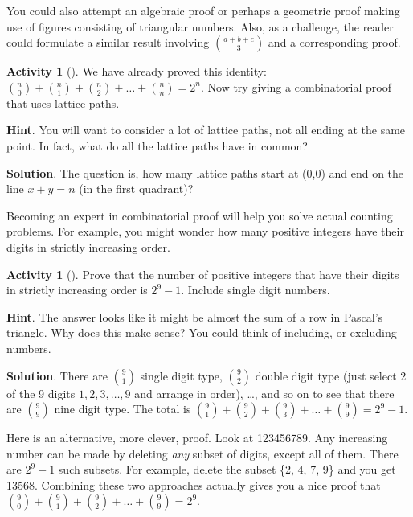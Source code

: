 \documentclass[10pt,]{book}
\theoremstyle{plain}
\theoremstyle{definition}
\theoremstyle{definition}
\theoremstyle{definition}
\newtheorem{activity}[project]{Activity}
\theoremstyle{definition}
\numberwithin{equation}{chapter}
\begin{document}
\hypertarget{p-590}{}%
You could also attempt an algebraic proof or perhaps a geometric proof making use of figures consisting of triangular numbers. Also, as a challenge, the reader could formulate a similar result involving \(\binom{a + b + c}{3}\) and a corresponding proof.%
\begin{activity}[]\label{activity-39}
\hypertarget{p-591}{}%
We have already proved this identity: \(\binom{n}{0} + \binom{n}{1} + \binom{n}{2} + \ldots + \binom{n}{n} = 2^{n}\).  Now try giving a combinatorial proof that uses lattice paths.%
\par\smallskip%
\noindent\textbf{Hint}.\hypertarget{hint-27}{}\quad%
\hypertarget{p-592}{}%
You will want to consider a lot of lattice paths, not all ending at the same point.  In fact, what do all the lattice paths have in common?%
\par\smallskip%
\noindent\textbf{Solution}.\hypertarget{solution-47}{}\quad%
\hypertarget{p-593}{}%
The question is, how many lattice paths start at (0,0) and end on the line \(x+y=n\) (in the first quadrant)?%
\end{activity}
\hypertarget{p-594}{}%
Becoming an expert in combinatorial proof will help you solve actual counting problems.  For example, you might wonder how many positive integers have their digits in strictly increasing order.%
\begin{activity}[]\label{activity-40}
\hypertarget{p-595}{}%
Prove that the number of positive integers that have their digits in strictly increasing order is \(2^{9} - 1\). Include single digit numbers.%
\par\smallskip%
\noindent\textbf{Hint}.\hypertarget{hint-28}{}\quad%
\hypertarget{p-596}{}%
The answer looks like it might be almost the sum of a row in Pascal's triangle.  Why does this make sense?  You could think of including, or excluding numbers.%
\par\smallskip%
\noindent\textbf{Solution}.\hypertarget{solution-48}{}\quad%
\hypertarget{p-597}{}%
There are \(\binom{9}{1}\) single digit type, \(\binom{9}{2}\) double digit type (just select 2 of the 9 digits \(1, 2, 3, \ldots, 9\) and arrange in order), \ldots, and so on to see that there are \(\binom{9}{9}\) nine digit type. The total is \(\binom{9}{1} + \binom{9}{2} + \binom{9}{3} + \ldots + \binom{9}{9} = 2^{9} - 1\).%
\par
\hypertarget{p-598}{}%
Here is an alternative, more clever, proof. Look at 123456789. Any increasing number can be made by deleting \emph{any} subset of digits, except all of them. There are \(2^{9} - 1\) such subsets. For example, delete the subset \{2, 4, 7, 9\} and you get 13568. Combining these two approaches actually gives you a nice proof that \(\binom{9}{0} + \binom{9}{1} + \binom{9}{2} + \ldots + \binom{9}{9} = 2^{9}\).%
\end{activity}
\end{document}
